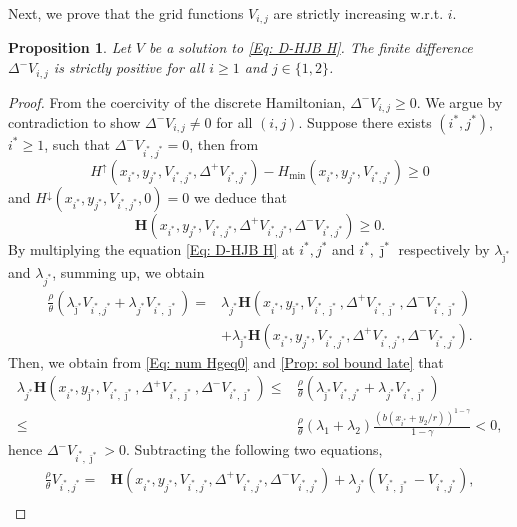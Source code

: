 \documentclass[11pt]{article}
\numberwithin{equation}{section}
\numberwithin{algorithm}{section}
\newtheorem{proposition}[proposition]{Proposition}
\newcommand{\lc}{\left(}
\newcommand{\rc}{\right)}
\newcommand{\beq}{\begin{equation}}
\newcommand{\eeq}{\end{equation}}
\theoremstyle{plain}
\newcommand{\D}{\Delta}
\begin{document}
Next, we prove that the grid functions ${V_{i,j}}$ are strictly increasing w.r.t. $i$.  
\begin{proposition}\label{Prop: positive Dv}
Let $V$ be a solution to \cref{Eq: D-HJB H}. The finite difference $\D^-{V_{i,j}}$ is strictly positive for all $i\geq1$ and $j\in \{1,2\}$.
\end{proposition}
\begin{proof}
From the coercivity of the discrete Hamiltonian, $\D^-{V_{i,j}}\geq 0$. We argue by contradiction to show $\D^-{V_{i,j}}\neq 0$ for all $(i,j)$. Suppose there exists $(i^*,j^*)$, $i^*\geq 1$, such that $\D^-{V_{i^*,j^*}}= 0$, then from 
$$
{H}^{\uparrow}\lc x_{i^*},y_{j^*},V_{i^*,j^*},\D^+{V_{i^*,j^*}}\rc-{H}_{\min}\lc x_{i^*},y_{j^*},V_{i^*,j^*}\rc\geq 0
$$
 and
${H}^{\downarrow} \lc x_{i^*},y_{j^*},V_{i^*,j^*},0\rc=0$
we deduce that 
\beq\label{Eq: num Hgeq0}
\boldsymbol{H}\lc x_{i^*},y_{j^*},V_{i^*,j^*},\D^+{V_{i^*,j^*}},\D^-{V_{i^*,j^*}}\rc\geq 0.
\eeq
By multiplying the equation \cref{Eq: D-HJB H} at ${i^*,j^*}$ and ${i^*,\bar \jmath^*}$ respectively by $\lambda_{\bar \jmath^*}$ and $\lambda_{j^*}$, summing up, we obtain
\begin{align*}
\frac{\rho}{\theta}\left(\lambda_{\bar \jmath^*}V_{i^*,j^*}+\lambda_{j^*}V_{i^*,\bar \jmath^*}\right)={}&\lambda_{j^*}\boldsymbol{H}\lc x_{i^*},y_{\bar \jmath^*},{V}_{i^*,\bar \jmath^*},\D^+{V_{i^*,\bar \jmath^*}},\D^-{V_{i^*,\bar \jmath^*}}\rc\\
{}&+\lambda_{\bar \jmath^*}\boldsymbol{H}\lc x_{i^*},y_{j^*},V_{i^*,j^*},\D^+{V_{i^*,j^*}},\D^-{V_{i^*,j^*}}\rc.
\end{align*}
Then, we obtain from \cref{Eq: num Hgeq0} and \cref{Prop: sol bound late} that
\begin{align*}
\lambda_{j^*}\boldsymbol{H}\lc x_{i^*},y_{\bar \jmath^*},{V}_{i^*,\bar \jmath^*},\D^+{V_{i^*,\bar \jmath^*}},\D^-{V_{i^*,\bar \jmath^*}}\rc\leq {}&\frac{\rho}{\theta}\left(\lambda_{\bar \jmath^*}V_{i^*,j^*}+\lambda_{j^*}V_{i^*,\bar \jmath^*}\right)\\
 \leq {}&\frac{\rho}{\theta}\left(\lambda_1+\lambda_2\right)\frac{(b(x_{i^*}+y_2/r))^{1-\gamma}}{1-\gamma}<0,
\end{align*}
hence $\D^-{V_{i^*,\bar \jmath^*}}>0$. Subtracting the following two equations,
\begin{align*}
\frac{\rho}{\theta} V_{i^*,j^*}
={}&\boldsymbol{H}\lc x_{i^*},y_{j^*},V_{i^*,j^*},\D^+{V_{i^*,j^*}},\D^-{V_{i^*,j^*}}\rc
+\lambda_{j^*}\lc V_{i^*,\bar \jmath^*}-V_{i^*,j^*} \rc,\\

\end{align*}
\end{proof}
\end{document}

